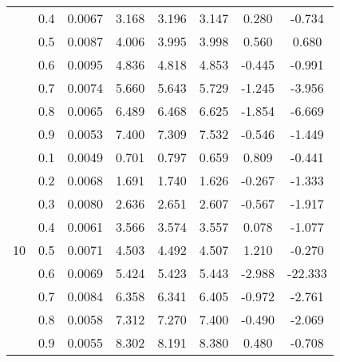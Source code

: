 \documentclass[11pt,a4paper]{report}
\begin{document}
\begin{longtable}{ | c | c || c | c | c | c | c | c | }
 & 0.4 & 0.0067 & 3.168 & 3.196 & 3.147 & 0.280 & -0.734 \\
 & 0.5 & 0.0087 & 4.006 & 3.995 & 3.998 & 0.560 & 0.680 \\
 & 0.6 & 0.0095 & 4.836 & 4.818 & 4.853 & -0.445 & -0.991 \\
 & 0.7 & 0.0074 & 5.660 & 5.643 & 5.729 & -1.245 & -3.956 \\
 & 0.8 & 0.0065 & 6.489 & 6.468 & 6.625 & -1.854 & -6.669 \\
 & 0.9 & 0.0053 & 7.400 & 7.309 & 7.532 & -0.546 & -1.449 \\
 \hline
\multirow{9}{*}{10} & 0.1 & 0.0049 & 0.701 & 0.797 & 0.659 & 0.809 & -0.441 \\
 & 0.2 & 0.0068 & 1.691 & 1.740 & 1.626 & -0.267 & -1.333 \\
 & 0.3 & 0.0080 & 2.636 & 2.651 & 2.607 & -0.567 & -1.917 \\
 & 0.4 & 0.0061 & 3.566 & 3.574 & 3.557 & 0.078 & -1.077 \\
 & 0.5 & 0.0071 & 4.503 & 4.492 & 4.507 & 1.210 & -0.270 \\
 & 0.6 & 0.0069 & 5.424 & 5.423 & 5.443 & -2.988 & -22.333 \\
 & 0.7 & 0.0084 & 6.358 & 6.341 & 6.405 & -0.972 & -2.761 \\
 & 0.8 & 0.0058 & 7.312 & 7.270 & 7.400 & -0.490 & -2.069 \\
 & 0.9 & 0.0055 & 8.302 & 8.191 & 8.380 & 0.480 & -0.708 \\
 \hline
\hline
\end{longtable}
\end{document}
